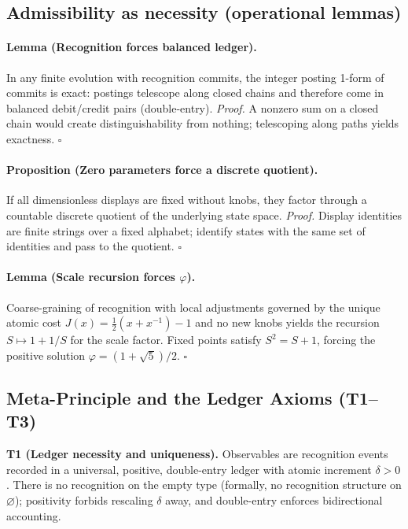 \documentclass[11pt]{article}
\begin{document}
\subsection{Admissibility as necessity (operational lemmas)}
\paragraph{Lemma (Recognition forces balanced ledger).} In any finite evolution with recognition commits, the integer posting 1\mbox{-}form of commits is exact: postings telescope along closed chains and therefore come in balanced debit/credit pairs (double\mbox{-}entry). \emph{Proof.} A nonzero sum on a closed chain would create distinguishability from nothing; telescoping along paths yields exactness. \hfill$\square$

\paragraph{Proposition (Zero parameters force a discrete quotient).} If all dimensionless displays are fixed without knobs, they factor through a countable discrete quotient of the underlying state space. \emph{Proof.} Display identities are finite strings over a fixed alphabet; identify states with the same set of identities and pass to the quotient. \hfill$\square$

\paragraph{Lemma (Scale recursion forces $\varphi$).} Coarse\mbox{-}graining of recognition with local adjustments governed by the unique atomic cost \(J(x)=\tfrac12(x+x^{-1})-1\) and no new knobs yields the recursion \(S\mapsto 1+1/S\) for the scale factor. Fixed points satisfy \(S^2=S+1\), forcing the positive solution \(\varphi=(1+\sqrt{5})/2\). \hfill$\square$

\subsection{Meta\mbox{-}Principle and the Ledger Axioms (T1--T3)}
\textbf{T1 (Ledger necessity and uniqueness).} Observables are recognition events recorded in a universal, positive, double\mbox{-}entry ledger with atomic increment \(\delta>0\). There is no recognition on the empty type (formally, no recognition structure on \(\varnothing\)); positivity forbids rescaling \(\delta\) away, and double\mbox{-}entry enforces bidirectional accounting.
\end{document}
